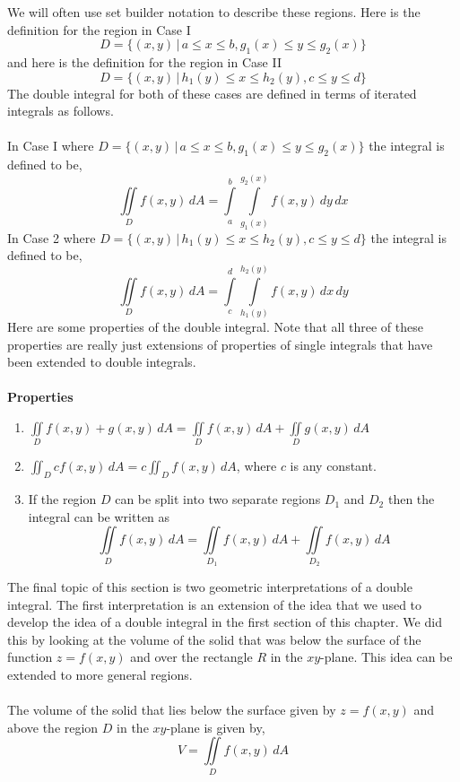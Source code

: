 \documentclass[10pt,reqno]{book}
\theoremstyle{definition}
\begin{document}
	We will often use set builder notation to describe these regions. Here is the definition for the region in Case I
	\[ D = \{ (x,y) \, \lvert \, a \leq x \leq b, g_1(x) \leq y \leq g_2(x) \} \]
	and here is the definition for the region in Case II
	\[ D = \{ (x,y) \, \lvert \, h_1(y) \leq x \leq h_2(y), c \leq y \leq d \} \]
	The double integral for both of these cases are defined in terms of iterated integrals as follows.\\ \\
	In Case I where $ D = \{ (x,y) \, \lvert \, a \leq x \leq b, g_1(x) \leq y \leq g_2(x) \} $ the integral is defined to be,
	\[ \iint\limits_D f(x,y)\,dA = \int\limits_a^b \int\limits_{g_1(x)}^{g_2(x)} f(x,y)\,dy\,dx \]
	In Case 2 where $ D = \{ (x,y) \, \lvert \, h_1(y) \leq x \leq h_2(y), c \leq y \leq d \} $ the integral is defined to be,
	\[ \iint\limits_D f(x,y)\,dA = \int\limits_c^d \int\limits_{h_1(y)}^{h_2(y)} f(x,y)\,dx\,dy \]
	Here are some properties of the double integral. Note that all three of these properties are really just extensions of properties of single integrals that have been extended to double integrals.\\ \\
	\textbf{Properties}
	\begin{enumerate}
		\item $ \displaystyle{\iint\limits_D f(x,y) + g(x,y)\,dA = \iint\limits_D f(x,y)\,dA + \iint\limits_D g(x,y)\,dA} $
		\item $ \displaystyle{\iint_D cf(x,y)\,dA = c\iint_D f(x,y)\,dA} $, where $ c $ is any constant.
		\item If the region $ D $ can be split into two separate regions $ D_1 $ and $ D_2 $ then the integral can be written as
		\[ \iint\limits_D f(x,y)\,dA = \iint\limits_{D_1} f(x,y)\,dA + \iint\limits_{D_2} f(x,y)\,dA \]
	\end{enumerate}
	The final topic of this section is two geometric interpretations of a double integral. The first interpretation is an extension of the idea that we used to develop the idea of a double integral in the first section of this chapter. We did this by looking at the volume of the solid that was below the surface of the function $ z = f(x,y) $ and over the rectangle $ R $ in the $ xy $-plane. This idea can be extended to more general regions.\\ \\
	The volume of the solid that lies below the surface given by $ z = f(x,y) $ and above the region $ D $ in the $ xy $-plane is given by,
	\[ V = \iint\limits_D f(x,y)\,dA \]
\end{document}
